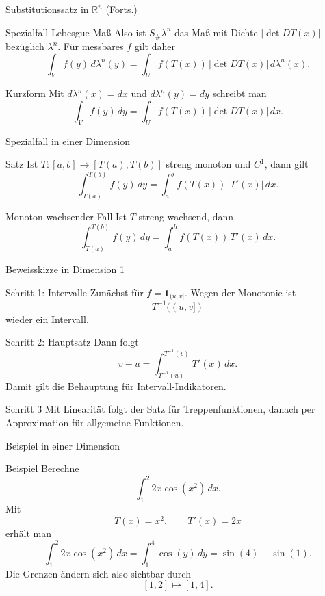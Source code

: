 \documentclass{beamer}
\begin{document}
\begin{frame}{Substitutionssatz in \(\mathbb R^n\) (Forts.)}
\begin{block}{Spezialfall Lebesgue-Maß}
Also ist \(S_\#\lambda^n\) das Maß mit Dichte \(|\det DT(x)|\) bezüglich \(\lambda^n\).
Für messbares \(f\) gilt daher
\[
\int_V f(y)\,d\lambda^n(y)
=
\int_U f(T(x))\,|\det DT(x)|\,d\lambda^n(x).
\]
\end{block}

\begin{block}{Kurzform}
Mit \(d\lambda^n(x)=dx\) und \(d\lambda^n(y)=dy\) schreibt man
\[
\int_V f(y)\,dy
=
\int_U f(T(x))\,|\det DT(x)|\,dx.
\]
\end{block}
\end{frame}

\begin{frame}{Spezialfall in einer Dimension}
\begin{block}{Satz}
Ist \(T\colon [a,b]\to[T(a),T(b)]\) streng monoton und \(C^1\), dann gilt
\[
\int_{T(a)}^{T(b)} f(y)\,dy
=
\int_a^b f(T(x))\,|T'(x)|\,dx.
\]
\end{block}

\begin{block}{Monoton wachsender Fall}
Ist \(T\) streng wachsend, dann
\[
\int_{T(a)}^{T(b)} f(y)\,dy
=
\int_a^b f(T(x))\,T'(x)\,dx.
\]
\end{block}
\end{frame}

\begin{frame}{Beweisskizze in Dimension 1}
\begin{block}{Schritt 1: Intervalle}
Zunächst für \(f=\mathbf 1_{(u,v]}\).
Wegen der Monotonie ist
\[
T^{-1}((u,v])
\]
wieder ein Intervall.
\end{block}

\begin{block}{Schritt 2: Hauptsatz}
Dann folgt
\[
v-u=\int_{T^{-1}(u)}^{T^{-1}(v)} T'(x)\,dx.
\]
Damit gilt die Behauptung für Intervall-Indikatoren.
\end{block}

\begin{block}{Schritt 3}
Mit Linearität folgt der Satz für Treppenfunktionen, danach per Approximation für allgemeine Funktionen.
\end{block}
\end{frame}

\begin{frame}{Beispiel in einer Dimension}
\begin{block}{Beispiel}
Berechne
\[
\int_1^2 2x\cos(x^2)\,dx.
\]
Mit
\[
T(x)=x^2,\qquad T'(x)=2x
\]
erhält man
\[
\int_1^2 2x\cos(x^2)\,dx
=
\int_1^4 \cos(y)\,dy
=
\sin(4)-\sin(1).
\]
Die Grenzen ändern sich also sichtbar durch
\[
[1,2]\mapsto [1,4].
\]
\end{block}
\end{frame}
\end{document}
